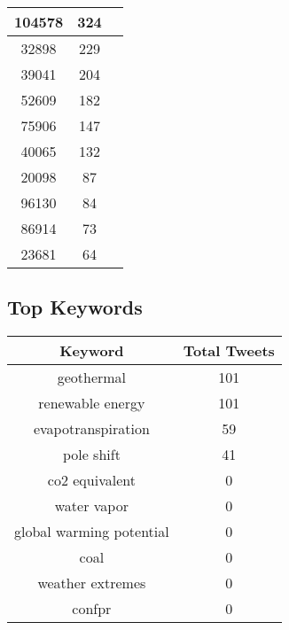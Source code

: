 \documentclass{article}\usepackage[T1]{fontenc}
\begin{document}
\begin{tabular}{|c|c|c|}
 \hline
104578 & 324\\ 
 \hline
32898 & 229\\ 
 \hline
39041 & 204\\ 
 \hline
52609 & 182\\ 
 \hline
75906 & 147\\ 
 \hline
40065 & 132\\ 
 \hline
20098 & 87\\ 
 \hline
96130 & 84\\ 
 \hline
86914 & 73\\ 
 \hline
23681 & 64\\ 
 \hline
\end{tabular}\subsection*{Top Keywords}\begin{tabular}{|c|c|}         \hline         Keyword & Total Tweets \\ 
 \hline
geothermal & 101\\ 
 \hline
renewable energy & 101\\ 
 \hline
evapotranspiration & 59\\ 
 \hline
pole shift & 41\\ 
 \hline
co2 equivalent & 0\\ 
 \hline
water vapor & 0\\ 
 \hline
global warming potential & 0\\ 
 \hline
coal & 0\\ 
 \hline
weather extremes & 0\\ 
 \hline
confpr & 0\\ 
 \hline
\end{tabular}
\end{document}
